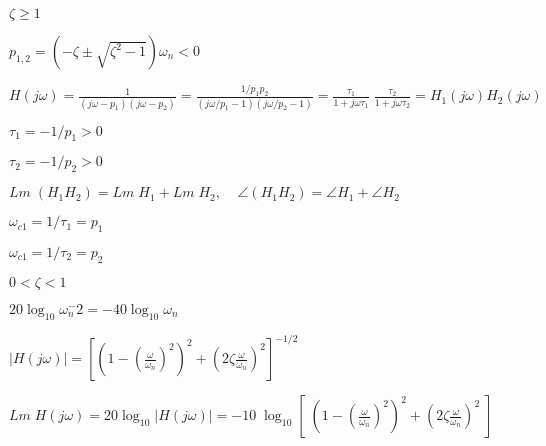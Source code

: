 \documentclass{article}
\def\lthtmlcheckvsize{\ifdim\ht\sizebox<\vsize 
  \ifdim\wd\sizebox<\hsize\expandafter\hfill\fi \expandafter\vfill
  \else\expandafter\vss\fi}%
\begin{document}
{\newpage\clearpage
{}%
$\zeta\ge 1$%
\lthtmlindisplaymathZ
\lthtmlcheckvsize\clearpage}

{\newpage\clearpage
{}%
$\displaystyle p_{1,2}=(-\zeta\pm\sqrt{\zeta^2-1})\omega_n < 0 $%
\lthtmlindisplaymathZ
\lthtmlcheckvsize\clearpage}

{\newpage\clearpage
{}%
$\displaystyle H(j\omega)=\frac{1}{(j\omega-p_1)(j\omega-p_2)} 
  =\frac{1/p_1p_2}{(j\omega/p_1-1)(j\omega/p_2-1)} 
  =\frac{\tau_1}{1+j\omega\tau_1}\;\frac{\tau_2}{1+j\omega\tau_2}
  =H_1(j\omega)H_2(j\omega) $%
\lthtmlindisplaymathZ
\lthtmlcheckvsize\clearpage}

{\newpage\clearpage
{}%
$\tau_1=-1/p_1>0$%
\lthtmlindisplaymathZ
\lthtmlcheckvsize\clearpage}

{\newpage\clearpage
{}%
$\tau_2=-1/p_2>0$%
\lthtmlindisplaymathZ
\lthtmlcheckvsize\clearpage}

{\newpage\clearpage
{}%
$\displaystyle Lm\;(H_1 H_2)=Lm\; H_1+Lm\; H_2,\;\;\;\;\angle (H_1 H_2)=\angle H_1+\angle H_2 $%
\lthtmlindisplaymathZ
\lthtmlcheckvsize\clearpage}

{\newpage\clearpage
{}%
$\omega_{c1}=1/\tau_1=p_1$%
\lthtmlindisplaymathZ
\lthtmlcheckvsize\clearpage}

{\newpage\clearpage
{}%
$\omega_{c1}=1/\tau_2=p_2$%
\lthtmlindisplaymathZ
\lthtmlcheckvsize\clearpage}

{\newpage\clearpage
{}%
$0<\zeta<1$%
\lthtmlindisplaymathZ
\lthtmlcheckvsize\clearpage}

{\newpage\clearpage
{}%
$20\log_{10} \omega_n^{-}2=-40\log_{10} \omega_n$%
\lthtmlindisplaymathZ
\lthtmlcheckvsize\clearpage}

{\newpage\clearpage
{}%
$\displaystyle |H(j\omega)|=[(1-(\frac{\omega}{\omega_n})^2)^2+(2\zeta\frac{\omega}{\omega_n})^2]^{-1/2}$%
\lthtmlindisplaymathZ
\lthtmlcheckvsize\clearpage}

{\newpage\clearpage
{}%
$\displaystyle Lm\;H(j\omega)=20\log_{10} |H(j\omega)|
=-10\;\log_{10}[\; (1-(\frac{\omega}{\omega_n})^2)^2+(2\zeta\frac{\omega}{\omega_n})^2\;]$%
\lthtmlindisplaymathZ
\lthtmlcheckvsize\clearpage}
\end{document}
